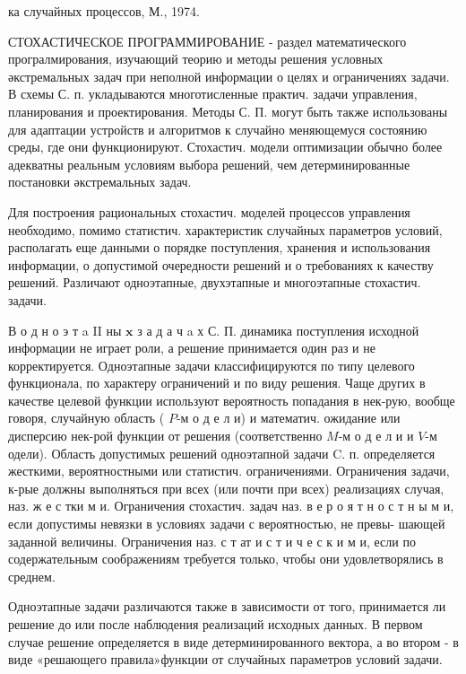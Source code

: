 \documentclass[10pt]{article}
\begin{document}
ка случайных процессов, М., 1974.



СТОХАСТИЧЕСКОЕ ПРОГРАММИРОВАНИЕ - раздел математического програлмирования, изучающий теорию и методы решения условных әкстремальных задач при неполной информации о целях и ограничениях задачи. В схемы С. п. укладываются многотисленные практич. задачи управления, планирования и проектирования. Методы С. П. могут быть также использованы для адаптации устройств и алгоритмов к случайно меняющемуся состоянию среды, где они функционируют. Стохастич. модели оптимизации обычно более адекватны реальным условиям выбора решений, чем детерминированные постановки әкстремальных задач.



Для построения рациональных стохастич. моделей процессов управления необходимо, помимо статистич. характеристик случайных параметров условий, располагать еще данными о порядке поступления, хранения и использования информации, о допустимой очередности решений и о требованиях к качеству решений. Различают одноэтапные, двухэтапные и многоэтапные стохастич. задачи.



В $о$ д н о э т a II ны $\mathbf{x}$ з а д а ч a х С. П. динамика поступления исходной информации не играет роли, а решение принимается один раз и не корректируется. Одноэтапные задачи классифицируются по типу целевого функционала, по характеру ограничений и по виду решения. Чаще других в качестве целевой функции используют вероятность попадания в нек-рую, вообще говоря, случайную область ( $P$-м о д е л и) и математич. ожидание или дисперсию нек-рой функции от решения (соответственно $M$-м о д е л и и $V$-м одели). Область допустимых решений одноэтапной задачи C. п. определяется жесткими, вероятностными или статистич. ограничениями. Ограничения задачи, к-рые должны выполняться при всех (или почти при всех) реализациях случая, наз. ж е с тки м и. Ограничения стохастич. задач наз. в е р о я т н о с т н ы м и, если допустимы невязки в условиях задачи с вероятностью, не превы- шающей заданной величины. Ограничения наз. с т ат и с т и ч е с к и м и, если по содержательным соображениям требуется только, чтобы они удовлетворялись в среднем.



Одноэтапные задачи различаются также в зависимости от того, принимается ли решение до или после наблюдения реализаций исходных данных. В первом случае решение определяется в виде детерминированного вектора, а во втором - в виде «решающего правила»функции от случайных параметров условий задачи.
\end{document}
